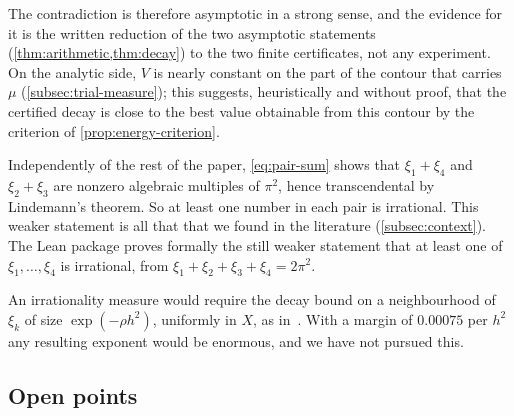 The contradiction is therefore asymptotic in a strong sense, and the evidence for it is the
written reduction of the two asymptotic statements (\cref{thm:arithmetic,thm:decay}) to the two
finite certificates, not any experiment. On the analytic side, $V$ is nearly constant on the part
of the contour that carries $\mu$ (\cref{subsec:trial-measure}); this suggests, heuristically and
without proof, that the certified decay is close to the best value obtainable from this contour
by the criterion of \cref{prop:energy-criterion}.

\begin{remark}\label{rem:pairwise}
Independently of the rest of the paper, \eqref{eq:pair-sum} shows that $\xi_1+\xi_4$ and
$\xi_2+\xi_3$ are nonzero algebraic multiples of $\pi^2$, hence transcendental by Lindemann's
theorem. So at least one number in each pair is irrational. This weaker statement is all that
that we found in the literature (\cref{subsec:context}). The Lean package proves formally the still weaker
statement that at least one of $\xi_1,\dots,\xi_4$ is irrational, from
$\xi_1+\xi_2+\xi_3+\xi_4=2\pi^2$.
\end{remark}

\begin{remark}\label{rem:no-measure}
An irrationality measure would require the decay bound on a neighbourhood of $\xi_k$ of size
$\exp(-\rho h^2)$, uniformly in $X$, as in~\cite[\S\S6, 11]{Litsey2026Lowner}. With a margin of
$0.00075$ per $h^2$ any resulting exponent would be enormous, and we have not pursued this.
\end{remark}

\subsection{Open points}\label{subsec:open-points}

